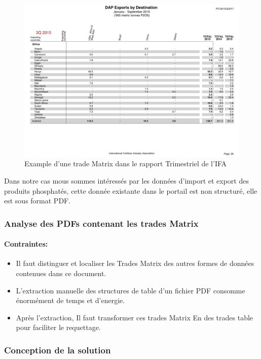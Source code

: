 	\par
	\begin{figure}[H]
	    		\centering
    			\includegraphics[scale=0.6]{IFA_EX}
	    		\caption{Example d'une trade Matrix dans le rapport Trimestriel de l'IFA}
	    		\label{fig:IFA-PDF}
	\end{figure}
	\par
	Dans notre cas mous sommes intéressés par les données d'import et export des produits phosphatés, cette donnée existante dans le portail est non structuré, elle est sous format PDF.
	\subsubsection{Analyse des PDFs contenant les trades Matrix}
		
	\paragraph{Contraintes:}
	\begin{itemize}
		\item Il faut distinguer et localiser les Trades Matrix des autres formes de données contenues dans ce document.
		\item L'extraction manuelle des structures de table d'un fichier PDF consomme énormément de temps et d'energie.
		\item Après l'extraction, Il faut transformer ces trades Matrix En des trades table pour faciliter le requettage.
	\end{itemize}
	\subsubsection{Conception de la solution}
